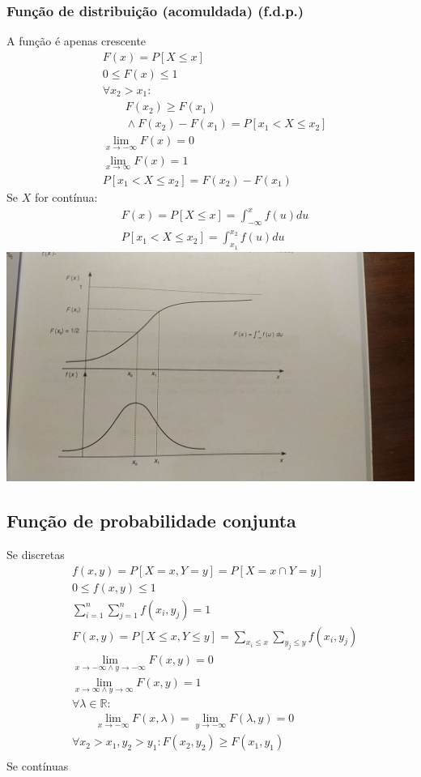 \documentclass[a4paper]{article}
\begin{document}
\begin{multicols}{3}
\subsubsection{Função de distribuição (acomuldada) (f.d.p.)}
A função é apenas crescente
\begin{align*}
  &F(x) = P[X \leq x] \\
  &0 \leq F(x) \leq 1 \\
  &\forall x_2 > x_1: \\
    &\qquad F(x_2) \geq F(x_1) \\ 
    &\qquad \land F(x_2) - F(x_1) = P[x_1 < X \leq x_2] \\
  &\lim_{x \to -\infty} F(x) = 0 \\ 
  &\lim_{x \to \infty} F(x) = 1 \\
  &P[x_1 < X \leq x_2] = F(x_2) - F(x_1)
\end{align*}
Se $X$ for contínua:
\begin{align*}
  &F(x) = P[X \leq x] = \int_{-\infty}^x f(u) du \\
  &P[x_1 < X \leq x_2] = \int_{x_1}^{x_2} f(u) du
\end{align*}
\includegraphics[width=\columnwidth]{fda.jpg} %
\subsection{Função de probabilidade conjunta}
Se discretas
\begin{align*}
  &f(x, y) = P[X = x, Y = y] = P[X = x \cap Y = y]\\
  &0 \leq f(x, y) \leq 1 \\
  &\sum_{i=1}^n \sum_{j=1}^n f(x_i, y_j) = 1 \\
  &F(x, y) = P[X \leq x, Y \leq y] = \sum_{x_i \leq x} \sum_{y_j \leq y} f(x_i, y_j) \\
  &\lim_{x \to -\infty \land y \to -\infty} F(x, y) = 0 \\
  &\lim_{x \to \infty \land y \to \infty} F(x, y) = 1 \\
  &\forall \lambda \in \mathbb{R}: \\
    &\qquad \lim_{x \to -\infty } F(x, \lambda) = \lim_{y \to -\infty } F(\lambda, y) = 0 \\
  &\forall x_2 > x_1, y_2 > y_1: F(x_2, y_2) \geq F(x_1, y_1) \\
\end{align*}
Se contínuas


\end{multicols}
\end{document}
